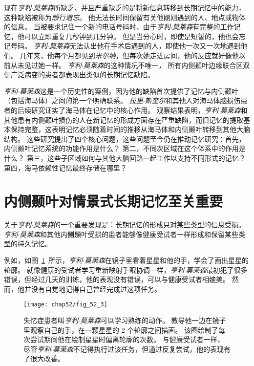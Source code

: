 现在\textit{亨利$\cdot$莫莱森}所缺乏、并且严重缺乏的是将新信息转移到长期记忆中的能力，这种缺陷被称为\textit{顺行遗忘}。
他无法长时间保留有关他刚刚遇到的人、地点或物体的信息。
当被要求记住一个新的电话号码时，由于\textit{亨利$\cdot$莫莱森}有完整的工作记忆，他可以立即重复几秒钟到几分钟。
但是当分心时，即使是短暂的，他也会忘记号码。
\textit{亨利$\cdot$莫莱森}无法认出他在手术后遇到的人，即使他一次又一次地遇到他们。
几年来，他每个月都见到\textit{米尔纳}，但每次她走进房间，他的反应就好像他以前从未见过她一样。
\textit{亨利$\cdot$莫莱森}的这种情况不唯一，
所有内侧颞叶边缘联合区双侧广泛病变的患者都表现出类似的长期记忆缺陷。


\textit{亨利$\cdot$莫莱森}这是一个历史性的案例，因为他的缺陷首次提供了记忆与内侧颞叶（包括海马体）之间的第一个明确联系。
\textit{拉里$\cdot$斯奎尔}和其他人对海马体脑损伤患者的后续研究证实了海马体在记忆中的核心作用。
观察结果表明，\textit{亨利$\cdot$莫莱森}和其他患有内侧颞叶损伤的人在新记忆的形成方面存在严重缺陷，而旧记忆的提取基本保持完整，这表明记忆必须随着时间的推移从海马体和内侧颞叶转移到其他大脑结构。
这些研究提出了四个核心问题，这些问题至今仍在推动记忆研究：首先，内侧颞叶记忆系统的功能作用是什么？
第二，不同次区域在这个体系中的作用是什么？
第三，这些子区域如何与其他大脑回路一起工作以支持不同形式的记忆？
第四，海马依赖性记忆最终存储在哪里？



\section{内侧颞叶对情景式长期记忆至关重要}

关于\textit{亨利$\cdot$莫莱森}的一个重要发现是：长期记忆的形成只对某些类型的信息受损。
\textit{亨利$\cdot$莫莱森}和其他内侧颞叶受损的患者能够像健康受试者一样形成和保留某些类型的持久记忆。


例如，如图~\ref{fig:52_3}~所示，\textit{亨利$\cdot$莫莱森}在镜子里看着星星和他的手，学会了画出星星的轮廓。
就像健康的受试者学习重新映射手眼协调一样，\textit{亨利$\cdot$莫莱森}最初犯了很多错误，但经过几天的训练，他的表现没有错误，可以与健康受试者相媲美。
然而，他并没有自觉地记得自己曾经完成过这项任务。


\begin{figure}[htbp]
	\centering
	\texttt{[image: chap52/fig\_52\_3]}
	\caption{失忆症患者叫\textit{亨利$\cdot$莫莱森}可以学习熟练的动作。
		教导他一边在镜子里观察自己的手，在一颗星星的 2 个轮廓之间描画。
		该图绘制了每次尝试期间他在绘制星星时偏离轮廓的次数。
		与健康受试者一样，尽管\textit{亨利$\cdot$莫莱森}不记得执行过该任务，但通过反复尝试，他的表现有了很大改善\cite{blakemore1977mechanics}。}
	\label{fig:52_3}
\end{figure}


